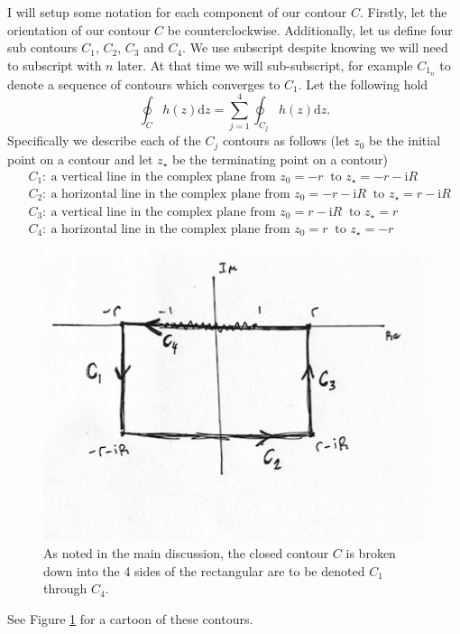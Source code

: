 \documentclass[10pt]{amsart}
\newcommand{\D}{\mathrm{d}}
\newcommand{\I}{\mathrm{i}}
\theoremstyle{nonumberplain}
\begin{document}
\begin{enumerate}[label={\bf {\arabic*}:}]
\begin{itemize}
\noindent
I will setup some notation for each component of our contour $C$.
Firstly, let the orientation of our contour $C$ be counterclockwise.
Additionally, let us define four sub contours $C_1$, $C_2$, $C_3$ and $C_4$.
We use subscript despite knowing we will need to subscript with $n$ later.
At that time we will sub-subscript, for example $C_{1_n}$ to denote a sequence of contours which converges to $C_1$.
Let the following hold
$$\oint_C h(z) \D z = \sum_{j = 1}^{4} \oint_{C_j}h(z) \D z.$$
Specifically we describe each of the $C_j$ contours as follows (let $z_0$ be the initial point on a contour and let $z_{\star}$ be the terminating point on a contour)
\begin{align*}
&C_1: \: \text{a vertical line in the complex plane from } z_0=-r \: \text{ to }  z_{\star}=-r-\I R \\
&C_2: \: \text{a horizontal line in the complex plane from } z_0=-r-\I R \: \text{ to }  z_{\star}=r-\I R \\
&C_3: \: \text{a vertical line in the complex plane from } z_0=r-\I R \: \text{ to }  z_{\star}=r \\
&C_4: \: \text{a horizontal line in the complex plane from } z_0=r \: \text{ to }  z_{\star}=-r
\end{align*}
\begin{figure}[h]
	\centering
	\includegraphics{five-part-one-contour}
	\caption{
		As noted in the main discussion, the closed contour $C$ is broken down into the 4 sides of the rectangular are to be denoted $C_1$ through $C_4$.
	}\label{fig:f1}
\end{figure}
See Figure \ref{fig:f1} for a cartoon of these contours.
\\


\end{itemize}
\end{enumerate}
\end{document}
